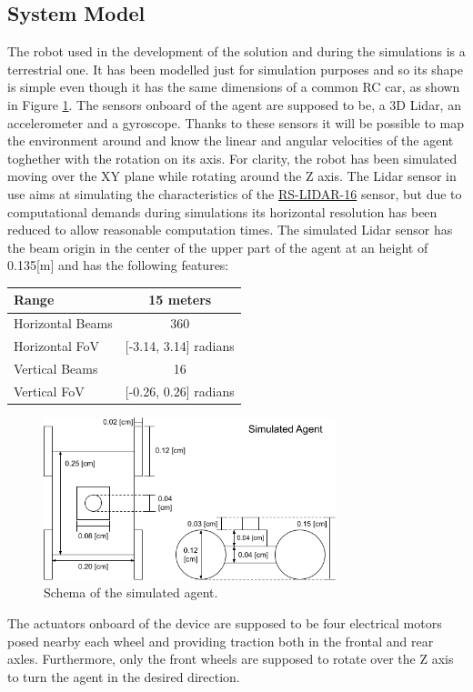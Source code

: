 \documentclass[twocolumn, a4paper]{article}
\begin{document}
\subsection{System Model}
The robot used in the development of the solution and during the simulations
is a terrestrial one. It has been modelled just for simulation purposes
and so its shape is simple even though it has the same dimensions of
a common RC car, as shown in Figure \ref{fig:Robot_dimensions}.
The sensors onboard of the agent are supposed to be, a 3D Lidar, an
accelerometer and a gyroscope. Thanks to these sensors it will be possible
to map the environment around and know the linear and angular velocities
of the agent toghether with the rotation on its axis.
For clarity, the robot has been simulated moving over the XY plane while
rotating around the Z axis.
The Lidar sensor in use aims at simulating the characteristics of the 
\href{https://www.robosense.ai/en/rslidar/RS-LiDAR-16}{RS-LIDAR-16} sensor,
but due to computational demands during simulations its horizontal resolution
has been reduced to allow reasonable computation times.
The simulated Lidar sensor has the beam origin in the center of the upper part
of the agent at an height of 0.135[m] and has the following features:

\begin{center}
\begin{tabular}{| l | c |}
    \hline
    Range & 15 meters \\
    \hline
    Horizontal Beams & 360 \\
    \hline
    Horizontal FoV & [-3.14, 3.14] radians \\
    \hline
    Vertical Beams & 16 \\
    \hline
    Vertical FoV & [-0.26, 0.26] radians \\
    \hline
\end{tabular}
\end{center}
\vspace{0.3cm}
\begin{figure}[h]
    \centering
    \includegraphics[width=8.5cm]{"../Report_images/Agent_schema"}
    \caption{Schema of the simulated agent.}
    \label{fig:Robot_dimensions}
\end{figure}
The actuators onboard of the device are supposed to be four electrical motors
posed nearby each wheel and providing traction both in the frontal and rear
axles. Furthermore, only the front wheels are supposed to rotate over
the Z axis to turn the agent in the desired direction.
\end{document}
